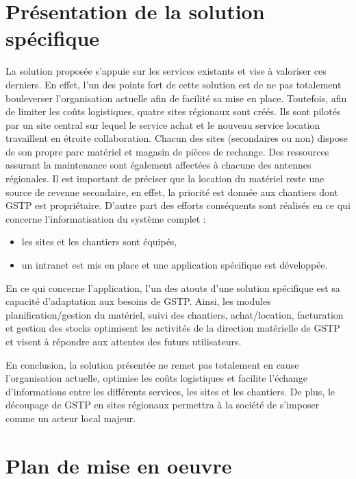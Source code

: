 \section{Présentation de la solution spécifique}
La solution proposée s’appuie sur les services existants et vise à valoriser ces derniers. 
En effet, l’un des points fort de cette solution est de ne pas totalement bouleverser l’organisation actuelle afin de facilité sa mise en place.
Toutefois, afin de limiter les coûts logistiques, quatre sites régionaux sont créés. Ils sont pilotés par un site central sur lequel le service achat et le nouveau service location travaillent en étroite collaboration. Chacun des sites (secondaires ou non) dispose de son propre parc matériel et magasin de pièces de rechange. Des ressources assurant la maintenance sont également affectées à chacune des antennes régionales. 
Il est important de préciser que la location du matériel reste une source de revenue secondaire, en effet, la priorité est donnée aux chantiers dont GSTP est propriétaire.
D’autre part des efforts conséquents sont réalisés en ce qui concerne l’informatisation du système complet :
    \begin{itemize}
        \item les sites et les chantiers sont équipés,
        \item un intranet est mis en place et une application spécifique est développée.
    \end{itemize}

En ce qui concerne l’application, l’un des atouts d’une solution spécifique est sa capacité d’adaptation aux besoins de GSTP. 
Ainsi, les modules planification/gestion du matériel, suivi des chantiers, achat/location, facturation et gestion des stocks optimisent les activités de la direction matérielle de GSTP et visent à répondre aux attentes des futurs utilisateurs.

En conclusion, la solution présentée ne remet pas totalement en cause l’organisation actuelle, optimise les coûts logistiques et facilite l’échange d’informations entre les différents services, les sites et les chantiers. 
De plus, le découpage de GSTP en sites régionaux permettra à la société de s’imposer comme un acteur local majeur.


\section{Plan de mise en oeuvre}
    
